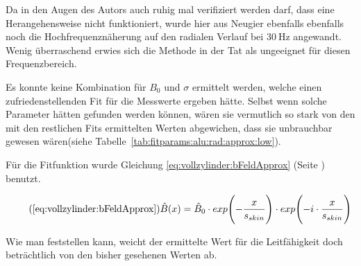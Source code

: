 {	\begin{minipage}[t]{0.33\textwidth}
        \vspace{0mm}
        Da in  den Augen des  Autors auch  ruhig mal verifiziert  werden darf,
        dass eine Herangehensweise nicht  funktioniert, wurde hier aus Neugier
        ebenfalls ebenfalls  noch die Hochfrequenzn\"aherung auf  den radialen
        Verlauf   bei  $\SI{30}{\hertz}$   angewandt.   Wenig   \"uberraschend
        erwies  sich  die Methode  in  der  Tat  als ungeeignet  f\"ur  diesen
        Frequenzbereich.

        Es  konnte  keine  Kombination  f\"ur  $B_0$  und  $\sigma$  ermittelt
        werden,  welche  einen  zufriedenstellenden Fit  f\"ur  die  Messwerte
        ergeben h\"atte. Selbst wenn solche Parameter h\"atten gefunden werden
        k\"onnen, w\"aren sie  vermutlich so stark von den  mit den restlichen
        Fits  ermittelten  Werten  abgewichen, dass  sie  unbrauchbar  gewesen
        w\"aren(siehe Tabelle~\ref{tab:fitparams:alu:rad:approx:low}).

        F\"ur               die                Fitfunktion               wurde
        Gleichung           \ref{eq:vollzylinder:bFeldApprox}           (Seite
        \pageref{eq:vollzylinder:bFeldApprox}) benutzt.

        \begin{equation}
            \tag{\ref{eq:vollzylinder:bFeldApprox}}
            \hat{B} (x) = \hat{B}_0 \cdot exp\Biggl(-\frac{x}{s_{skin}} \Biggr) \cdot exp\Biggl(-i \cdot \frac{x}{s_{skin}} \Biggr)
        \end{equation}

        

        \vspace{0.5em}

        Wie  man  feststellen  kann,  weicht der  ermittelte  Wert  f\"ur  die
        Leitf\"ahigkeit doch  betr\"achtlich von  den bisher  gesehenen Werten
        ab.
	\end{minipage}%
	\begin{minipage}[t]{0.67\textwidth}
        \vspace{0mm}
        \hfill
        \resizebox{.95\textwidth}{!}{}
        \label{fig:alu:rad:approx:low}
	\end{minipage}


}
